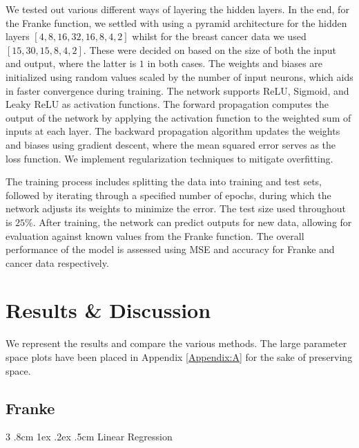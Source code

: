 \documentclass[%
reprint,s
amsmath,amssymb,
aps,
]{revtex4-2}
\makeatletter
\renewcommand{\subsubsection}{%
	\@startsection
	{subsubsection}%
	{3}%
	{\z@}%
	{.8cm \@plus1ex \@minus .2ex}%
	{.5cm}%
	{\normalfont\small\centering}%
}
\makeatother
\begin{document}
We tested out various different ways of layering the hidden layers. In the end, for the Franke function, we settled with using a pyramid architecture for the hidden layers $[4,8,16,32,16,8,4,2]$ whilst for the breast cancer data we used $[15,30,15,8,4,2]$. These were decided on based on the size of both the input and output, where the latter is $1$ in both cases. The weights and biases are initialized using random values scaled by the number of input neurons, which aids in faster convergence during training. The network supports ReLU, Sigmoid, and Leaky ReLU as activation functions. The forward propagation computes the output of the network by applying the activation function to the weighted sum of inputs at each layer. The backward propagation algorithm updates the weights and biases using gradient descent, where the mean squared error serves as the loss function. We implement regularization techniques to mitigate overfitting.

The training process includes splitting the data into training and test sets, followed by iterating through a specified number of epochs, during which the network adjusts its weights to minimize the error. The test size used throughout is $25\%$. After training, the network can predict outputs for new data, allowing for evaluation against known values from the Franke function. The overall performance of the model is assessed using MSE and accuracy for Franke and cancer data respectively.


\section{Results \& Discussion}
We represent the results and compare the various methods. The large parameter space plots have been placed in Appendix \ref{Appendix:A} for the sake of preserving space.

\subsection{Franke}
\subsubsection{Linear Regression}
\end{document}

